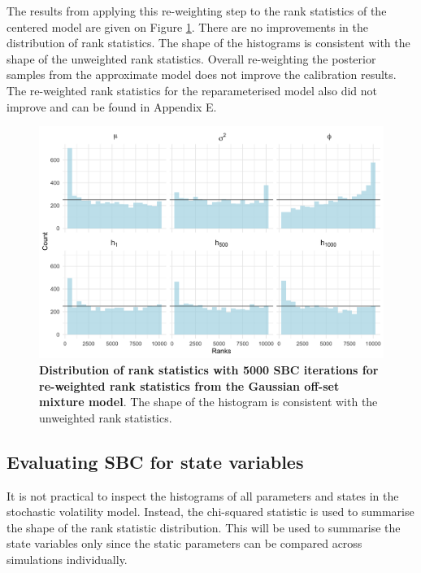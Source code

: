 \documentclass[12pt, a4paper]{article}
\begin{document}
    The results from applying this re-weighting step to the rank statistics of the centered model are given on Figure \ref{fig:reweight5k}. There are no improvements in the distribution of rank statistics. The shape of the histograms is consistent with the shape of the unweighted rank statistics. Overall re-weighting the posterior samples from the approximate model does not improve the calibration results. The re-weighted rank statistics for the reparameterised model also did not improve and can be found in Appendix E.

    \begin{figure}[H]
        \centering
        \includegraphics[scale=0.1]{results/weighted_ksc_cp_5k.png}
        \caption{\textbf{Distribution of rank statistics with 5000 SBC iterations for re-weighted rank statistics from the Gaussian off-set mixture model}. The shape of the histogram is consistent with the unweighted rank statistics.}
        \label{fig:reweight5k}
    \end{figure}

    \subsection{Evaluating SBC for state variables}
    It is not practical to inspect the histograms of all parameters and states in the stochastic volatility model. Instead, the chi-squared statistic is used to summarise the shape of the rank statistic distribution. This will be used to summarise the state variables only since the static parameters can be compared across simulations individually. 
\end{document}
